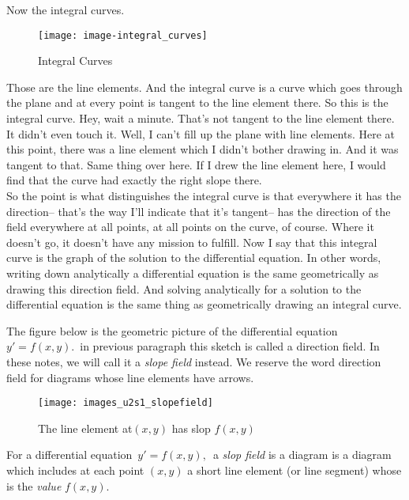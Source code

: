 Now the integral curves.

\begin{figure}[ht!]
  \centering
  \texttt{[image: image-integral\_curves]}
  \caption{Integral Curves}
\end{figure}

Those are the line elements.
And the integral curve is a curve which goes through the plane and at every point
is tangent to the line element there.
So this is the integral curve.
Hey, wait a minute.
That's not tangent to the line element there.
It didn't even touch it.
Well, I can't fill up the plane with line elements.
Here at this point, there was a line element which I didn't bother drawing in.
And it was tangent to that.
Same thing over here.
If I drew the line element here, I would find that the curve had exactly the right slope there. \\

So the point is what distinguishes
the integral curve is that everywhere it
has the direction-- that's the way I'll indicate that it's tangent--
has the direction of the field everywhere at all points, at all points on the curve, of course.
Where it doesn't go, it doesn't have any mission to fulfill.
Now I say that this integral curve
is the graph of the solution to the differential equation.
In other words, writing down analytically a differential equation is the same geometrically
as drawing this direction field.
And solving analytically for a solution to the differential
equation is the same thing as geometrically drawing an integral curve.

\clearpage

The figure below is the geometric picture of the differential equation
$y' = f(x, y).\,$
in previous paragraph this sketch is called a direction field.
In these notes, we will call it a \emph{slope field} instead.
We reserve the word direction field for diagrams whose line elements have arrows.

\begin{figure}[ht!]
  \centering
  \texttt{[image: images\_u2s1\_slopefield]}
  \caption{The line element at$(x,y)$ has slop $f(x,y)$}
\end{figure}

\begin{definition}
  For a differential equation $\, y'=f(x,y),\,$ a \emph{\color{blue}slop field} is
  a diagram is a diagram which includes at each point $(x, y)$ a short line
  element (or line segment) whose is the \emph{value} $f(x,y)$. 
\end{definition}

